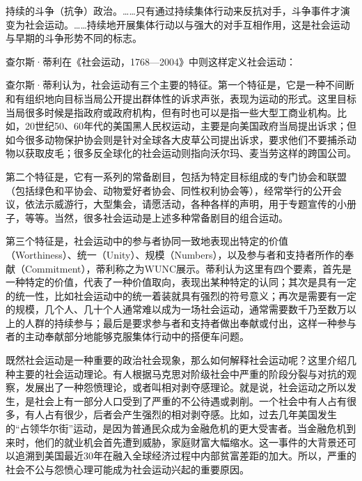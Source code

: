 {{{持续的斗争（抗争）政治。……只有通过持续集体行动来反抗对手，斗争事件才演变为社会运动。……持续地开展集体行动以与强大的对手互相作用，这是社会运动与早期的斗争形势不同的标志。}

查尔斯·蒂利在《社会运动，1768—2004》中则这样定义社会运动：


查尔斯·蒂利认为，社会运动有三个主要的特征。第一个特征是，它是一种不间断和有组织地向目标当局公开提出群体性的诉求声张，表现为运动的形式。这里目标当局很多时候是指政府或政府机构，但有时也可以是指一些大型工商业机构。比如，20世纪50、60年代的美国黑人民权运动，主要是向美国政府当局提出诉求；但如今很多动物保护协会则是针对全球各大皮草公司提出诉求，要求他们不要捕杀动物以获取皮毛；很多反全球化的社会运动则指向沃尔玛、麦当劳这样的跨国公司。

第二个特征是，它有一系列的常备剧目，包括为特定目标组成的专门协会和联盟（包括绿色和平协会、动物爱好者协会、同性权利协会等），经常举行的公开会议，依法示威游行，大型集会，请愿活动，各种各样的声明，用于专题宣传的小册子，等等。当然，很多社会运动是上述多种常备剧目的组合运动。

第三个特征是，社会运动中的参与者协同一致地表现出特定的价值（Worthiness）、统一（Unity）、规模（Numbers），以及参与者和支持者所作的奉献（Commitment），蒂利称之为WUNC展示。蒂利认为这里有四个要素，首先是一种特定的价值，代表了一种价值取向，表现出某种特定的认同；其次是具有一定的统一性，比如社会运动中的统一着装就具有强烈的符号意义；再次是需要有一定的规模，几个人、几十个人通常难以成为一场社会运动，通常需要数千乃至数万以上的人群的持续参与；最后是要求参与者和支持者做出奉献或付出，这样一种参与者的主动奉献部分地能够克服集体行动中的搭便车问题。

既然社会运动是一种重要的政治社会现象，那么如何解释社会运动呢？这里介绍几种主要的社会运动理论。有人根据马克思对阶级社会中严重的阶段分裂与对抗的观察，发展出了一种怨愤理论，或者叫相对剥夺感理论。就是说，社会运动之所以发生，是社会上有一部分人口受到了严重的不公待遇或剥削。一个社会中有人占有很多，有人占有很少，后者会产生强烈的相对剥夺感。比如，过去几年美国发生的“占领华尔街”运动，是因为普通民众成为金融危机的更大受害者。当金融危机到来时，他们的就业机会首先遭到威胁，家庭财富大幅缩水。这一事件的大背景还可以追溯到美国最近30年在融入全球经济过程中内部贫富差距的加大。所以，严重的社会不公与怨愤心理可能成为社会运动兴起的重要原因。

}}
